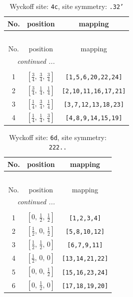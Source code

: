 \documentclass[fleqn,8pt]{jsarticle}
\begin{document}
\renewcommand{\arraystretch}{1.2}
\begin{longtable}{ccc}
\caption{Wyckoff site: {\tt 4c}, site symmetry: {\tt .32'}}
 \\
 \hline \hline
No. & position & mapping \\ \hline \endfirsthead

\multicolumn{2}{l}{\tablename\ \thetable{}} \\
 \hline \hline
No. & position & mapping \\ \hline \endhead

 \hline \hline
\multicolumn{2}{r}{\footnotesize\it continued ...} \\ \endfoot

 \hline \hline
\multicolumn{2}{r}{} \\ \endlastfoot

1 & $\left[ \frac{3}{4},\, \frac{3}{4},\, \frac{3}{4} \right]$ & {\tt [1,5,6,20,22,24]} \\ \hline
2 & $\left[ \frac{3}{4},\, \frac{1}{4},\, \frac{1}{4} \right]$ & {\tt [2,10,11,16,17,21]} \\ \hline
3 & $\left[ \frac{1}{4},\, \frac{3}{4},\, \frac{1}{4} \right]$ & {\tt [3,7,12,13,18,23]} \\ \hline
4 & $\left[ \frac{1}{4},\, \frac{1}{4},\, \frac{3}{4} \right]$ & {\tt [4,8,9,14,15,19]} \\
\end{longtable}
\renewcommand{\arraystretch}{1.2}
\begin{longtable}{ccc}
\caption{Wyckoff site: {\tt 6d}, site symmetry: {\tt 222..}}
 \\
 \hline \hline
No. & position & mapping \\ \hline \endfirsthead

\multicolumn{2}{l}{\tablename\ \thetable{}} \\
 \hline \hline
No. & position & mapping \\ \hline \endhead

 \hline \hline
\multicolumn{2}{r}{\footnotesize\it continued ...} \\ \endfoot

 \hline \hline
\multicolumn{2}{r}{} \\ \endlastfoot

1 & $\left[ 0,\, \frac{1}{2},\, \frac{1}{2} \right]$ & {\tt [1,2,3,4]} \\ \hline
2 & $\left[ \frac{1}{2},\, 0,\, \frac{1}{2} \right]$ & {\tt [5,8,10,12]} \\ \hline
3 & $\left[ \frac{1}{2},\, \frac{1}{2},\, 0 \right]$ & {\tt [6,7,9,11]} \\ \hline
4 & $\left[ \frac{1}{2},\, 0,\, 0 \right]$ & {\tt [13,14,21,22]} \\ \hline
5 & $\left[ 0,\, 0,\, \frac{1}{2} \right]$ & {\tt [15,16,23,24]} \\ \hline
6 & $\left[ 0,\, \frac{1}{2},\, 0 \right]$ & {\tt [17,18,19,20]} \\
\end{longtable}
\end{document}

